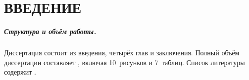 \chapter*{ВВЕДЕНИЕ}



{}
\paragraph{Структура и объём работы.}
%
%
Диссертация состоит из введения, четырёх глав и заключения.
Полный объём диссертации составляет , включая 10~рисунков и 7~таблиц.
Список литературы содержит .
